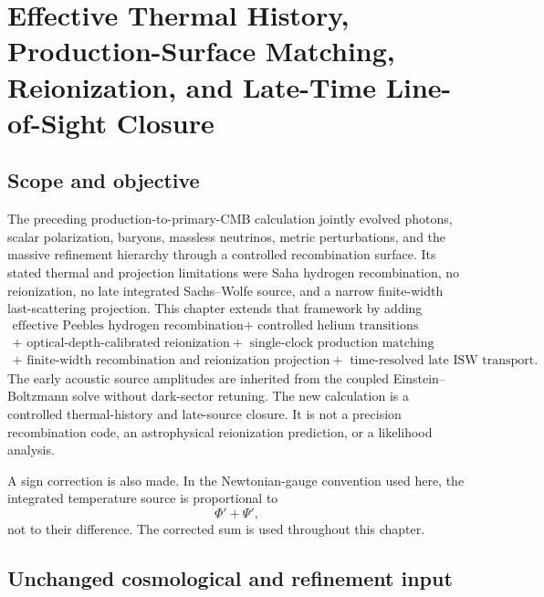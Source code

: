 \chapter{Effective Thermal History, Production-Surface Matching, Reionization, and Late-Time Line-of-Sight Closure}
\label{ch:thermal-reionization-los}

\section{Scope and objective}

The preceding production-to-primary-CMB calculation jointly evolved photons, scalar polarization, baryons, massless neutrinos, metric perturbations, and the massive refinement hierarchy through a controlled recombination surface.  Its stated thermal and projection limitations were Saha hydrogen recombination, no reionization, no late integrated Sachs--Wolfe source, and a narrow finite-width last-scattering projection.  This chapter extends that framework by adding
\begin{equation}
\boxed{
\begin{gathered}
\text{effective Peebles hydrogen recombination}
+\text{ controlled helium transitions}\\
+\text{ optical-depth-calibrated reionization}
+\text{ single-clock production matching}\\
+\text{ finite-width recombination and reionization projection}
+\text{ time-resolved late ISW transport}.
\end{gathered}}
\label{eq:trl-objective}
\end{equation}
The early acoustic source amplitudes are inherited from the coupled Einstein--Boltzmann solve without dark-sector retuning.  The new calculation is a controlled thermal-history and late-source closure.  It is not a precision recombination code, an astrophysical reionization prediction, or a likelihood analysis.

A sign correction is also made.  In the Newtonian-gauge convention used here, the integrated temperature source is proportional to
\begin{equation}
\Phi'+\Psi',
\label{eq:trl-isw-sum}
\end{equation}
not to their difference.  The corrected sum is used throughout this chapter.

\section{Unchanged cosmological and refinement input}

